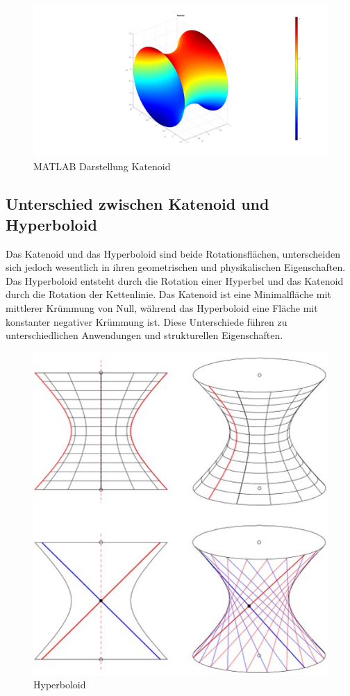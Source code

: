 \begin{figure}
	\centering
	\includegraphics[width=0.7\linewidth]{papers/minimalflaechen/Katenoid}
	\caption{MATLAB Darstellung Katenoid}
	\label{fig:katenoid}
\end{figure}


\subsection{Unterschied zwischen Katenoid und Hyperboloid
	\label{Das Katenoid:subsection:Unterschied zwischen Katenoid und Hyperboloid}}
Das Katenoid und das Hyperboloid sind beide Rotationsflächen, unterscheiden sich jedoch wesentlich in ihren geometrischen und physikalischen Eigenschaften.
Das Hyperboloid entsteht durch die Rotation einer Hyperbel und das Katenoid durch die Rotation der Kettenlinie. 
Das Katenoid ist eine Minimalfläche mit mittlerer Krümmung von Null, während das Hyperboloid eine Fläche mit konstanter negativer Krümmung ist.
Diese Unterschiede führen zu unterschiedlichen Anwendungen und strukturellen Eigenschaften.
\begin{figure}
	\centering
	\includegraphics[width=0.7\linewidth]{papers/minimalflaechen/Bild1}
	\caption{Hyperboloid}
	\label{fig:bild1}
\end{figure}

